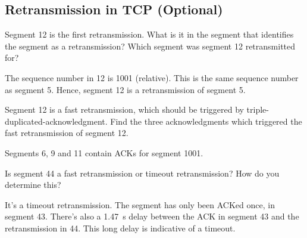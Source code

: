 \subsection{Retransmission in TCP (Optional)}
\begin{Question}
	Segment 12 is the first retransmission. What is it in the segment that identifies the segment as a retransmission? Which segment was segment 12 retransmitted for?
\end{Question}
\begin{Answer}
	The sequence number in 12 is 1001 (relative).
	This is the same sequence number as segment 5.
	Hence, segment 12 is a retransmission of segment 5.
\end{Answer}

\begin{Question}
	Segment 12 is a fast retransmission, which should be triggered by triple- duplicated-acknowledgment. Find the three acknowledgments which triggered the fast retransmission of segment 12.
\end{Question}
\begin{Answer}
	Segments 6, 9 and 11 contain ACKs for segment 1001.
\end{Answer}

\begin{Question}
	Is segment 44 a fast retransmission or timeout retransmission? How do you determine this?
\end{Question}
\begin{Answer}
	It's a timeout retransmission.
	The segment has only been ACKed once, in segment 43.
	There's also a \SI{1.47}{\second} delay between the ACK in segment 43 and the retransmission in 44.
	This long delay is indicative of a timeout.
\end{Answer}
